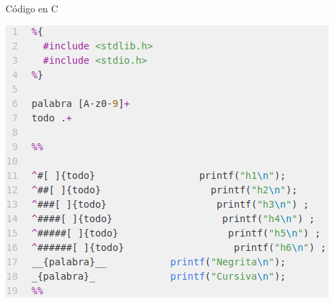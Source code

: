 \documentclass[11pt]{beamer}
\begin{document}
\begin{frame}[fragile]{Código en C}

\begin{center}
\includegraphics[scale=0.55]{imagenes/code.png} 

\end{center}
\end{frame}
\end{document}
